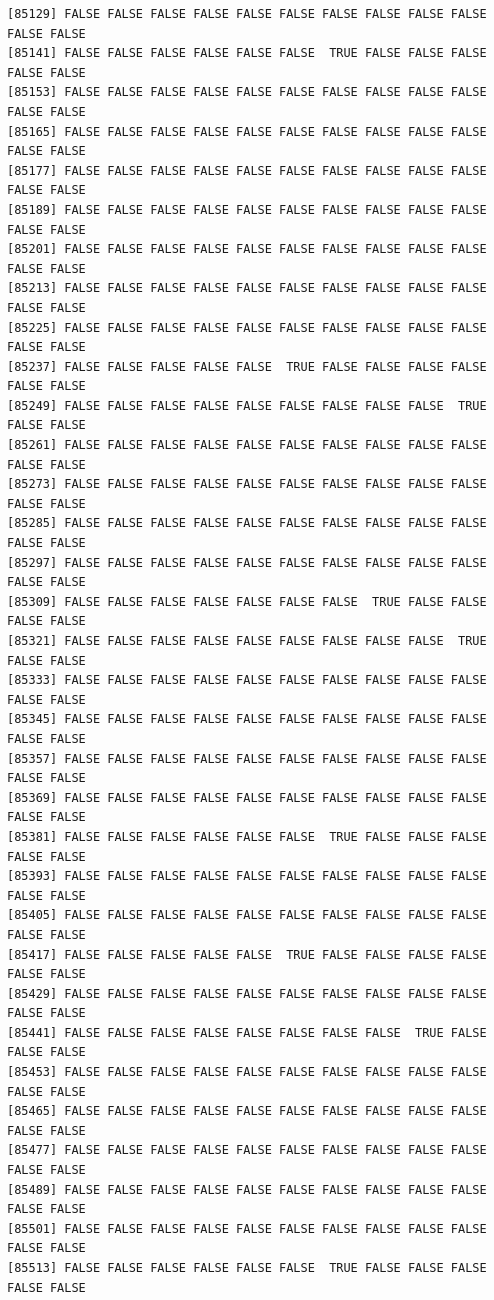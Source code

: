 \documentclass[
  a4paper,
  DIV=11,
  numbers=noendperiod]{scrartcl}
\begin{document}
\begin{verbatim}
[85129] FALSE FALSE FALSE FALSE FALSE FALSE FALSE FALSE FALSE FALSE FALSE FALSE
[85141] FALSE FALSE FALSE FALSE FALSE FALSE  TRUE FALSE FALSE FALSE FALSE FALSE
[85153] FALSE FALSE FALSE FALSE FALSE FALSE FALSE FALSE FALSE FALSE FALSE FALSE
[85165] FALSE FALSE FALSE FALSE FALSE FALSE FALSE FALSE FALSE FALSE FALSE FALSE
[85177] FALSE FALSE FALSE FALSE FALSE FALSE FALSE FALSE FALSE FALSE FALSE FALSE
[85189] FALSE FALSE FALSE FALSE FALSE FALSE FALSE FALSE FALSE FALSE FALSE FALSE
[85201] FALSE FALSE FALSE FALSE FALSE FALSE FALSE FALSE FALSE FALSE FALSE FALSE
[85213] FALSE FALSE FALSE FALSE FALSE FALSE FALSE FALSE FALSE FALSE FALSE FALSE
[85225] FALSE FALSE FALSE FALSE FALSE FALSE FALSE FALSE FALSE FALSE FALSE FALSE
[85237] FALSE FALSE FALSE FALSE FALSE  TRUE FALSE FALSE FALSE FALSE FALSE FALSE
[85249] FALSE FALSE FALSE FALSE FALSE FALSE FALSE FALSE FALSE  TRUE FALSE FALSE
[85261] FALSE FALSE FALSE FALSE FALSE FALSE FALSE FALSE FALSE FALSE FALSE FALSE
[85273] FALSE FALSE FALSE FALSE FALSE FALSE FALSE FALSE FALSE FALSE FALSE FALSE
[85285] FALSE FALSE FALSE FALSE FALSE FALSE FALSE FALSE FALSE FALSE FALSE FALSE
[85297] FALSE FALSE FALSE FALSE FALSE FALSE FALSE FALSE FALSE FALSE FALSE FALSE
[85309] FALSE FALSE FALSE FALSE FALSE FALSE FALSE  TRUE FALSE FALSE FALSE FALSE
[85321] FALSE FALSE FALSE FALSE FALSE FALSE FALSE FALSE FALSE  TRUE FALSE FALSE
[85333] FALSE FALSE FALSE FALSE FALSE FALSE FALSE FALSE FALSE FALSE FALSE FALSE
[85345] FALSE FALSE FALSE FALSE FALSE FALSE FALSE FALSE FALSE FALSE FALSE FALSE
[85357] FALSE FALSE FALSE FALSE FALSE FALSE FALSE FALSE FALSE FALSE FALSE FALSE
[85369] FALSE FALSE FALSE FALSE FALSE FALSE FALSE FALSE FALSE FALSE FALSE FALSE
[85381] FALSE FALSE FALSE FALSE FALSE FALSE  TRUE FALSE FALSE FALSE FALSE FALSE
[85393] FALSE FALSE FALSE FALSE FALSE FALSE FALSE FALSE FALSE FALSE FALSE FALSE
[85405] FALSE FALSE FALSE FALSE FALSE FALSE FALSE FALSE FALSE FALSE FALSE FALSE
[85417] FALSE FALSE FALSE FALSE FALSE  TRUE FALSE FALSE FALSE FALSE FALSE FALSE
[85429] FALSE FALSE FALSE FALSE FALSE FALSE FALSE FALSE FALSE FALSE FALSE FALSE
[85441] FALSE FALSE FALSE FALSE FALSE FALSE FALSE FALSE  TRUE FALSE FALSE FALSE
[85453] FALSE FALSE FALSE FALSE FALSE FALSE FALSE FALSE FALSE FALSE FALSE FALSE
[85465] FALSE FALSE FALSE FALSE FALSE FALSE FALSE FALSE FALSE FALSE FALSE FALSE
[85477] FALSE FALSE FALSE FALSE FALSE FALSE FALSE FALSE FALSE FALSE FALSE FALSE
[85489] FALSE FALSE FALSE FALSE FALSE FALSE FALSE FALSE FALSE FALSE FALSE FALSE
[85501] FALSE FALSE FALSE FALSE FALSE FALSE FALSE FALSE FALSE FALSE FALSE FALSE
[85513] FALSE FALSE FALSE FALSE FALSE FALSE  TRUE FALSE FALSE FALSE FALSE FALSE

\end{verbatim}
\end{document}
